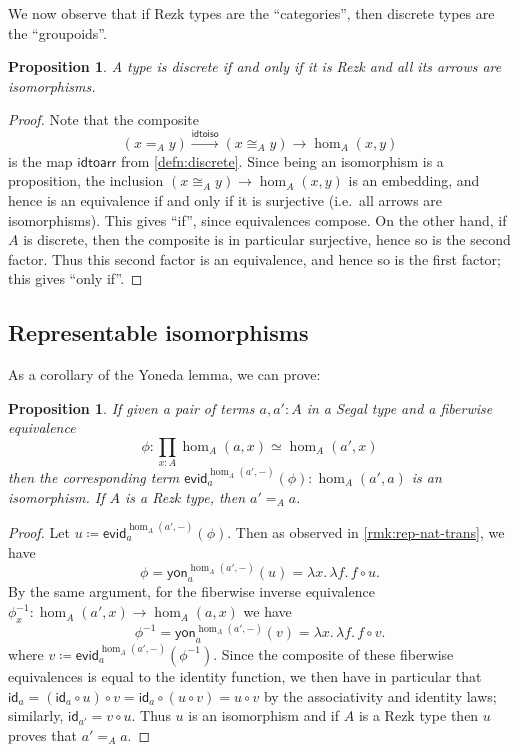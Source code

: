 \documentclass{amsart}
\theoremstyle{plain}
\newtheorem{prop}[thm]{Proposition}
\theoremstyle{definition}
\theoremstyle{remark}
\numberwithin{equation}{section}
\newcommand{\defeq}{\coloneqq}
\newcommand{\idtoiso}{\mathsf{idtoiso}}
\newcommand{\idtoarr}{\mathsf{idtoarr}}
\newcommand{\evid}{\mathsf{evid}}
\newcommand{\yon}{\mathsf{yon}}
\newcommand{\lam}[1]{\lambda #1.\,}
\newcommand{\idarr}[1]{\mathsf{id}_{#1}}
\let\xto\xrightarrow
\begin{document}
We now observe that if Rezk types are the ``categories'', then discrete types are the ``groupoids''.

\begin{prop}\label{prop:discrete-are-groupoid}
  A type is discrete if and only if it is Rezk and all its arrows are isomorphisms.
\end{prop}
\begin{proof}
  Note that the composite
  \[ (x=_A y) \xto{\idtoiso} (x\cong_A y) \longrightarrow \hom_A(x,y) \]
  is the map $\idtoarr$ from \cref{defn:discrete}.
  Since being an isomorphism is a proposition, the inclusion $(x\cong_A y) \to \hom_A(x,y)$ is an embedding, and hence is an equivalence if and only if it is surjective (i.e.\ all arrows are isomorphisms).
  This gives ``if'', since equivalences compose.
  On the other hand, if $A$ is discrete, then the composite is in particular surjective, hence so is the second factor. Thus this second factor is an equivalence, and hence so is the first factor; this gives ``only if''.
\end{proof}

\subsection{Representable isomorphisms}

As a corollary of the Yoneda lemma, we can prove:

\begin{prop}\label{prop:rep-iso} If given a pair of terms $a , a' : A$ in a Segal type  and a fiberwise equivalence
\[ \phi:\prod_{x : A} \hom_A(a,x) \simeq \hom_A(a',x)\] then the corresponding term $\evid^{\hom_A(a',-)}_a(\phi) : \hom_A(a',a)$ is an isomorphism. If $A$ is a Rezk type, then $a' =_A a$.
\end{prop}
\begin{proof}
  Let $u \defeq \evid^{\hom_A(a',-)}_a(\phi)$.
  Then as observed in \cref{rmk:rep-nat-trans}, we have
  \[ \phi = \yon^{\hom_A(a',-)}_a(u) = \lam{x} \lam{f} f \circ u. \] %
  By the same argument, for the fiberwise inverse equivalence $\phi_x^{-1}:\hom_A(a',x) \to \hom_A(a,x)$ we have
  \[ \phi^{-1} = \yon^{\hom_A(a',-)}_a(v) = \lam{x} \lam{f} f \circ v. \] %
  where $v \defeq \evid^{\hom_A(a',-)}_a(\phi^{-1})$.
  Since the composite of these fiberwise equivalences is equal to the identity function, we then have in particular that $\idarr a = (\idarr a \circ u) \circ v = \idarr a \circ  (u \circ v) = u \circ v$ by the associativity and identity laws; similarly, $\idarr {a'} = v \circ u$. Thus $u$ is an isomorphism and if $A$ is a Rezk type then $u$ proves that $a' =_A a$.
\end{proof}
\end{document}
